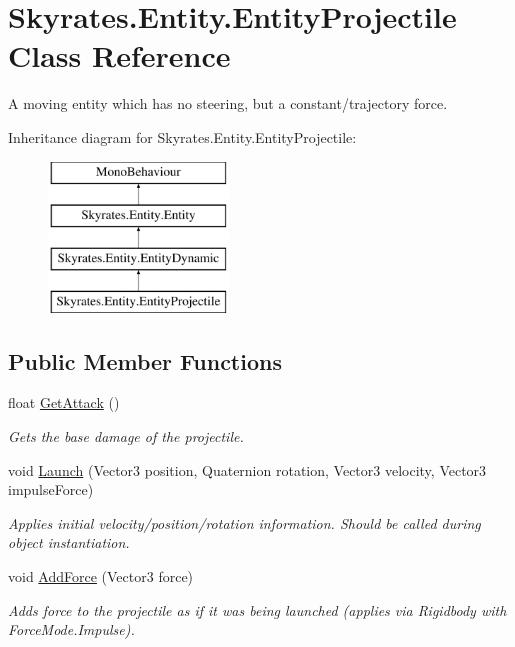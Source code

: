 \hypertarget{class_skyrates_1_1_entity_1_1_entity_projectile}{\section{Skyrates.\-Entity.\-Entity\-Projectile Class Reference}
\label{class_skyrates_1_1_entity_1_1_entity_projectile}
}


A moving entity which has no steering, but a constant/trajectory force.  


Inheritance diagram for Skyrates.\-Entity.\-Entity\-Projectile\-:\begin{figure}[H]
\begin{center}
\leavevmode
\includegraphics[height=4.000000cm]{class_skyrates_1_1_entity_1_1_entity_projectile}
\end{center}
\end{figure}
\subsection*{Public Member Functions}
\begin{DoxyCompactItemize}
\item 
float \hyperlink{class_skyrates_1_1_entity_1_1_entity_projectile_a6899df19c569d3bb389e6ef935b27c97}{Get\-Attack} ()
\begin{DoxyCompactList}\small\item\em Gets the base damage of the projectile. \end{DoxyCompactList}\item 
void \hyperlink{class_skyrates_1_1_entity_1_1_entity_projectile_af0aa2a2d8e3df3b5e9a6c86616d6c46b}{Launch} (Vector3 position, Quaternion rotation, Vector3 velocity, Vector3 impulse\-Force)
\begin{DoxyCompactList}\small\item\em Applies initial velocity/position/rotation information. Should be called during object instantiation. \end{DoxyCompactList}\item 
void \hyperlink{class_skyrates_1_1_entity_1_1_entity_projectile_ab402a467b9fa2d89be886b2a40910497}{Add\-Force} (Vector3 force)
\begin{DoxyCompactList}\small\item\em Adds force to the projectile as if it was being launched (applies via Rigidbody with Force\-Mode.\-Impulse). \end{DoxyCompactList}\end{DoxyCompactItemize}
